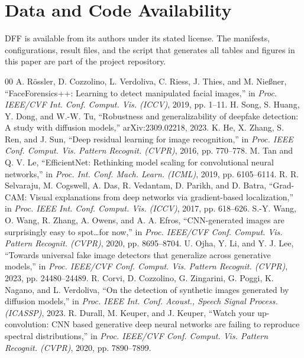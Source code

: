 \documentclass[conference]{IEEEtran}
\begin{document}
\section*{Data and Code Availability}
DFF is available from its authors under its stated license. The manifests, configurations, result files, and the script that generates all tables and figures in this paper are part of the project repository.

\begin{thebibliography}{00}
 A. R\"ossler, D. Cozzolino, L. Verdoliva, C. Riess, J. Thies, and M. Nie{\ss}ner, ``FaceForensics++: Learning to detect manipulated facial images,'' in \textit{Proc. IEEE/CVF Int. Conf. Comput. Vis. (ICCV)}, 2019, pp. 1--11.
 H. Song, S. Huang, Y. Dong, and W.-W. Tu, ``Robustness and generalizability of deepfake detection: A study with diffusion models,'' arXiv:2309.02218, 2023.
 K. He, X. Zhang, S. Ren, and J. Sun, ``Deep residual learning for image recognition,'' in \textit{Proc. IEEE Conf. Comput. Vis. Pattern Recognit. (CVPR)}, 2016, pp. 770--778.
 M. Tan and Q. V. Le, ``EfficientNet: Rethinking model scaling for convolutional neural networks,'' in \textit{Proc. Int. Conf. Mach. Learn. (ICML)}, 2019, pp. 6105--6114.
 R. R. Selvaraju, M. Cogswell, A. Das, R. Vedantam, D. Parikh, and D. Batra, ``Grad-CAM: Visual explanations from deep networks via gradient-based localization,'' in \textit{Proc. IEEE Int. Conf. Comput. Vis. (ICCV)}, 2017, pp. 618--626.
 S.-Y. Wang, O. Wang, R. Zhang, A. Owens, and A. A. Efros, ``CNN-generated images are surprisingly easy to spot\ldots for now,'' in \textit{Proc. IEEE/CVF Conf. Comput. Vis. Pattern Recognit. (CVPR)}, 2020, pp. 8695--8704.
 U. Ojha, Y. Li, and Y. J. Lee, ``Towards universal fake image detectors that generalize across generative models,'' in \textit{Proc. IEEE/CVF Conf. Comput. Vis. Pattern Recognit. (CVPR)}, 2023, pp. 24480--24489.
 R. Corvi, D. Cozzolino, G. Zingarini, G. Poggi, K. Nagano, and L. Verdoliva, ``On the detection of synthetic images generated by diffusion models,'' in \textit{Proc. IEEE Int. Conf. Acoust., Speech Signal Process. (ICASSP)}, 2023.
 R. Durall, M. Keuper, and J. Keuper, ``Watch your up-convolution: CNN based generative deep neural networks are failing to reproduce spectral distributions,'' in \textit{Proc. IEEE/CVF Conf. Comput. Vis. Pattern Recognit. (CVPR)}, 2020, pp. 7890--7899.

\end{thebibliography}
\end{document}
